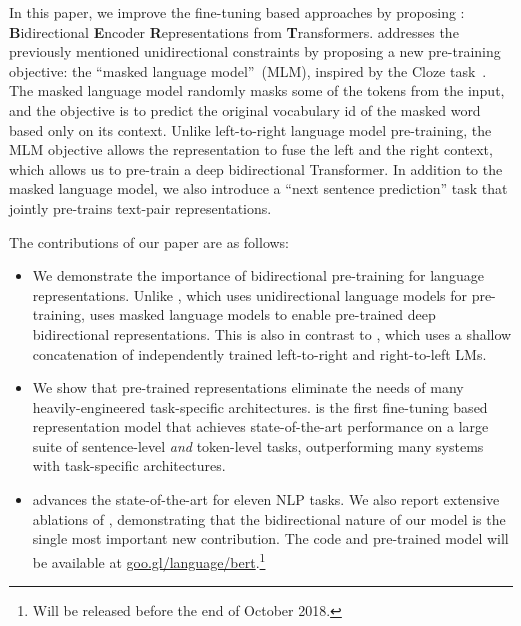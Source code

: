In this paper, we improve the fine-tuning based approaches by proposing \bert: \textbf{B}idirectional \textbf{E}ncoder \textbf{R}epresentations from \textbf{T}ransformers. \bert addresses the previously mentioned unidirectional constraints by proposing a new pre-training objective: the ``masked language model''~(MLM), inspired by the Cloze task~\cite{taylor:1953:_cloze}. The masked language model randomly masks some of the tokens from the input, and the objective is to predict the original vocabulary id of the masked word based only on its context. Unlike left-to-right language model pre-training, the MLM objective allows the representation to fuse the left and the right context, which allows us to pre-train a deep bidirectional Transformer. In addition to the masked language model, we also introduce a ``next sentence prediction'' task that jointly pre-trains text-pair representations.

The contributions of our paper are as follows:
\begin{itemize}
  \item We demonstrate the importance of bidirectional pre-training for language representations. Unlike \citet{radford-etal:2018}, which uses unidirectional language models for pre-training, \bert uses masked language models to enable pre-trained deep bidirectional representations. This is also in contrast to \citet{peters-etal:2018:_deep}, which uses a shallow concatenation of independently trained left-to-right and right-to-left LMs.
  \item We show that pre-trained representations eliminate the needs of many heavily-engineered task-specific architectures. \bert is the first fine-tuning based representation model that achieves state-of-the-art performance on a large suite of sentence-level {\em and} token-level tasks, outperforming many systems with task-specific architectures.
  \item \bert advances the state-of-the-art for eleven NLP tasks. We also report extensive ablations of \bert, demonstrating that the bidirectional nature of our model is the single most important new contribution. The code and pre-trained model will be available at \url{goo.gl/language/bert}.\footnote{Will be released before the end of October 2018.}
\end{itemize}
